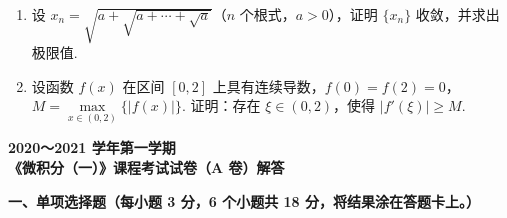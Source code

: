 \documentclass[a4paper,11pt]{ctexart}
\begin{document}
\begin{enumerate}[label=\arabic*., start=19, leftmargin=2em, itemsep=0.9em, topsep=0.5em]
  \item 设 $x_n = \sqrt{a + \sqrt{a + \cdots + \sqrt{a}}}$（$n$ 个根式，$a > 0$），证明 $\{x_n\}$ 收敛，并求出极限值.

  \item 设函数 $f(x)$ 在区间 $[0, 2]$ 上具有连续导数，$f(0) = f(2) = 0$，$M = \max\limits_{x\in(0,2)}\{|f(x)|\}$. 证明：存在 $\xi \in (0, 2)$，使得 $|f'(\xi)| \ge M$.
\end{enumerate}

\newpage

\begin{center}
  {\Large\bfseries 2020～2021 学年第一学期}\\[0.4em]
  {\Large\bfseries 《微积分（一）》课程考试试卷（A 卷）解答}
\end{center}

\vspace{0.6em}

\textbf{一、单项选择题（每小题 3 分，6 个小题共 18 分，将结果涂在答题卡上。）}
\end{document}
